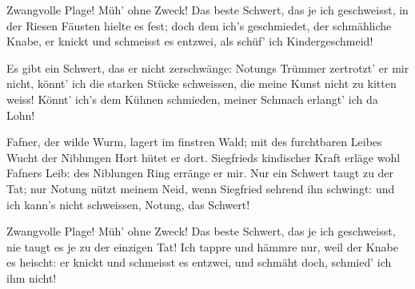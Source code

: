 \begin{drama}
\act

\scene


\Mimespeaks


Zwangvolle Plage!
Müh' ohne Zweck!
Das beste Schwert,
das je ich geschweisst,
in der Riesen Fäusten
hielte es fest;
doch dem ich's geschmiedet,
der schmähliche Knabe,
er knickt und schmeisst es entzwei,
als schüf' ich Kindergeschmeid!


Es gibt ein Schwert,
das er nicht zerschwänge:
Notungs Trümmer
zertrotzt' er mir nicht,
könnt' ich die starken
Stücke schweissen,
die meine Kunst
nicht zu kitten weiss!
Könnt' ich's dem Kühnen schmieden,
meiner Schmach erlangt' ich da Lohn!


Fafner, der wilde Wurm,
lagert im finstren Wald;
mit des furchtbaren Leibes Wucht
der Niblungen Hort
hütet er dort.
Siegfrieds kindischer Kraft
erläge wohl Fafners Leib:
des Niblungen Ring
erränge er mir.
Nur ein Schwert taugt zu der Tat;
nur Notung nützt meinem Neid,
wenn Siegfried sehrend ihn schwingt:
und ich kann's nicht schweissen,
Notung, das Schwert!


Zwangvolle Plage!
Müh' ohne Zweck!
Das beste Schwert,
das je ich geschweisst,
nie taugt es je
zu der einzigen Tat!
Ich tappre und hämmre nur,
weil der Knabe es heischt:
er knickt und schmeisst es entzwei,
und schmäht doch, schmied' ich ihm nicht!


\end{drama}
